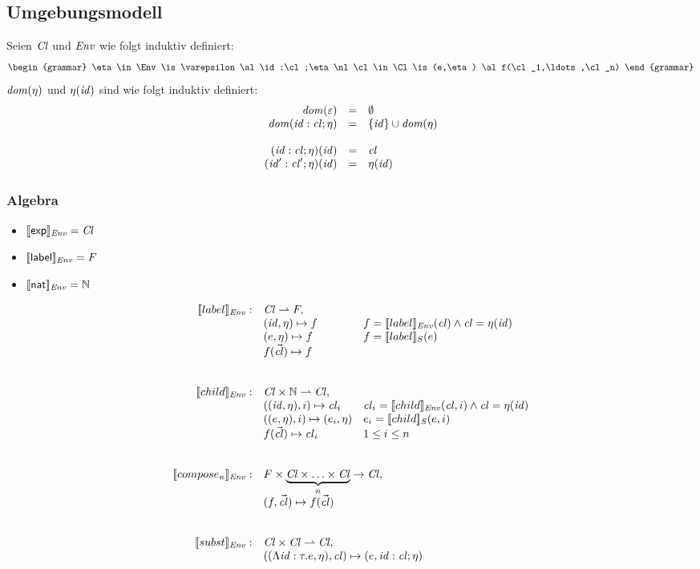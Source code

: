 \documentclass[12pt,a4paper,draft]{article}
\begin{document}
\subsection*{Umgebungsmodell}

Seien $\mathit{Cl}$ und $\mathit{Env}$ wie folgt induktiv definiert:
\[\begin{grammar}
  \eta \in \Env
  \is \varepsilon
  \al \id:\cl;\eta
  \nl
  \cl \in \Cl
  \is (e,\eta)
  \al f(\cl_1,\ldots,\cl_n)
\end{grammar}\]
$\mathit{dom}(\eta)$ und $\eta(\mathit{id})$ sind wie folgt induktiv definiert:
\[\begin{array}{rcl}
  \mathit{dom}(\varepsilon) &=& \emptyset \\
  \mathit{dom}(\mathit{id}:\mathit{cl};\eta) &=& \{\mathit{id}\} \cup \mathit{dom}(\eta) \\
  \\
  (\mathit{id}:\mathit{cl};\eta)(\mathit{id}) &=& \mathit{cl} \\
  (\mathit{id}':\mathit{cl}';\eta)(\mathit{id}) &=& \eta(\mathit{id}) \\
\end{array}\]

\subsubsection*{Algebra}

\begin{itemize}
\item $[\![\mathsf{exp}]\!]_{\mathit{Env}} = \mathit{Cl}$
\item $[\![\mathsf{label}]\!]_{\mathit{Env}} = F$
\item $[\![\mathsf{nat}]\!]_{\mathit{Env}} = \mathbb N$
\end{itemize}

\[\begin{array}{rll}
  \sem{label}_\Env: & \Cl \pto F, \\
  & (\id,\eta) \mapsto f & f = \sem{label}_\Env(\cl) \wedge \cl = \eta(\id) \\
  & (e,\eta) \mapsto f & f = \sem{label}_S(e) \\
  & f(\vec{\cl}) \mapsto f \\
  \\\\
  \sem{child}_\Env: & \Cl \times \N \pto \Cl, \\
  & ((\id,\eta),i) \mapsto \cl_i & \cl_i = \sem{child}_\Env(\cl, i) \wedge \cl = \eta(\id) \\
  & ((e,\eta),i) \mapsto (e_i,\eta) & e_i = \sem{child}_S(e,i) \\
  & f(\vec{\cl}) \mapsto \cl_i & 1 \le i \le n \\
  \\\\
  \sem{compose_n}_\Env: & \multicolumn{2}{l}{F \times \underbrace{\Cl \times \ldots \times \Cl}_n \to \Cl,} \\
  & \multicolumn{2}{l}{(f,\vec{\cl}) \mapsto f(\vec{\cl})} \\
  \\\\
  \sem{subst}_\Env: & \multicolumn{2}{l}{\Cl \times \Cl \pto \Cl,} \\
  & \multicolumn{2}{l}{((\Lambda\id:\tau.e,\eta),\cl) \mapsto (e,\id:\cl;\eta)}
\end{array}\]
\end{document}
